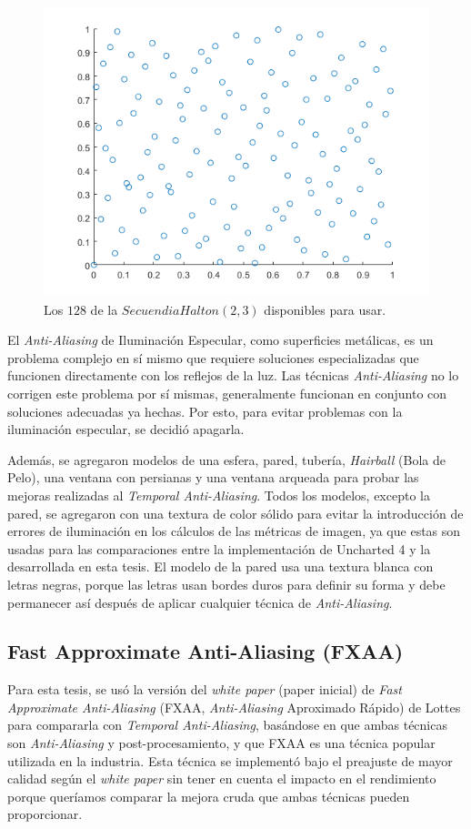 \documentclass[pregrado]{tesis-usb} %
\begin{document}
\begin{figure}[!hbt]
	\centering
	\includegraphics[scale=0.5]{images/halton_128.png}
	\caption{Los $128$ de la $Secuendia Halton (2,3)$ disponibles para usar.}\label{fig:halton128}
\end{figure}

El \textit{Anti-Aliasing} de Iluminación Especular, como superficies metálicas, es un problema complejo en sí mismo que requiere soluciones especializadas que funcionen directamente con los reflejos de la luz. Las técnicas \textit{Anti-Aliasing} no lo corrigen este problema por sí mismas, generalmente funcionan en conjunto con soluciones adecuadas ya hechas. Por esto, para evitar problemas con la iluminación especular, se decidió apagarla.

Además, se agregaron modelos de una esfera, pared, tubería, \textit{Hairball} (Bola de Pelo), una ventana con persianas y una ventana arqueada para probar las mejoras realizadas al \textit{Temporal Anti-Aliasing}. Todos los modelos, excepto la pared, se agregaron con una textura de color sólido para evitar la introducción de errores de iluminación en los cálculos de las métricas de imagen, ya que estas son usadas para las comparaciones entre la implementación de Uncharted 4 y la desarrollada en esta tesis. El modelo de la pared usa una textura blanca con letras negras, porque las letras usan bordes duros para definir su forma y debe permanecer así después de aplicar cualquier técnica de \textit{Anti-Aliasing}.

\subsection{Fast Approximate Anti-Aliasing (FXAA)}
Para esta tesis, se usó la versión del \textit{white paper} (paper inicial) de \textit{Fast Approximate Anti-Aliasing} (FXAA, \textit{Anti-Aliasing} Aproximado Rápido) de Lottes \cite{Lottes2009} para compararla con \textit{Temporal Anti-Aliasing}, basándose en que ambas técnicas son \textit{Anti-Aliasing} y post-procesamiento, y que FXAA es una técnica popular utilizada en la industria. Esta técnica se implementó bajo el preajuste de mayor calidad según el \textit{white paper} sin tener en cuenta el impacto en el rendimiento porque queríamos comparar la mejora cruda que ambas técnicas pueden proporcionar.
\end{document}
